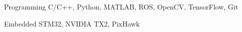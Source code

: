 

\begin{cvskills}

  \cvskill
    {Programming} %
    {C/C++, Python, MATLAB, ROS, OpenCV, TensorFlow, Git} %

  \cvskill
    {Embedded} %
    {STM32, NVIDIA TX2, PixHawk} %

\end{cvskills}
